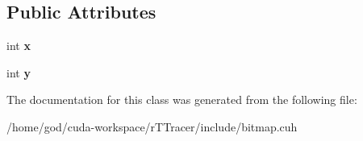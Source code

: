 \subsection*{Public Attributes}
\begin{DoxyCompactItemize}
\item 
int {\bfseries x}\hypertarget{class_bitmap_maker_a45b158013c295196bdaa491f6acd2a5c}{}\label{class_bitmap_maker_a45b158013c295196bdaa491f6acd2a5c}

\item 
int {\bfseries y}\hypertarget{class_bitmap_maker_af790b4055fcc02c12abdc6c19563f737}{}\label{class_bitmap_maker_af790b4055fcc02c12abdc6c19563f737}

\end{DoxyCompactItemize}


The documentation for this class was generated from the following file\+:\begin{DoxyCompactItemize}
\item 
/home/god/cuda-\/workspace/r\+T\+Tracer/include/bitmap.\+cuh\end{DoxyCompactItemize}
